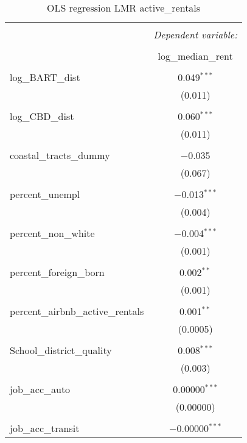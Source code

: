 \documentclass[10pt, letterpaper]{amsart}
\begin{document}
\begin{table}[H] \centering 
  \caption{OLS regression LMR active\_rentals} 
  \label{} 
  \begin{tabular}{@{\extracolsep{5pt}}lc} 
    \\[-1.8ex]\hline 
    \hline \\[-1.8ex] 
    & \multicolumn{1}{c}{\textit{Dependent variable:}} \\ 
    \cline{2-2} 
    \\[-1.8ex] & log\_median\_rent \\ 
    \hline \\[-1.8ex] 
    log\_BART\_dist & 0.049$^{***}$ \\ 
    & (0.011) \\ 
    & \\ 
    log\_CBD\_dist & 0.060$^{***}$ \\ 
    & (0.011) \\ 
    & \\ 
    coastal\_tracts\_dummy & $-$0.035 \\ 
    & (0.067) \\ 
    & \\ 
    percent\_unempl & $-$0.013$^{***}$ \\ 
    & (0.004) \\ 
    & \\ 
    percent\_non\_white & $-$0.004$^{***}$ \\ 
    & (0.001) \\ 
    & \\ 
    percent\_foreign\_born & 0.002$^{**}$ \\ 
    & (0.001) \\ 
    & \\ 
    percent\_airbnb\_active\_rentals & 0.001$^{**}$ \\ 
    & (0.0005) \\ 
    & \\ 
    School\_district\_quality & 0.008$^{***}$ \\ 
    & (0.003) \\ 
    & \\ 
    job\_acc\_auto & 0.00000$^{***}$ \\ 
    & (0.00000) \\ 
    & \\ 
    job\_acc\_transit & $-$0.00000$^{***}$ \\ 

\end{tabular}
\end{table}
\end{document}
